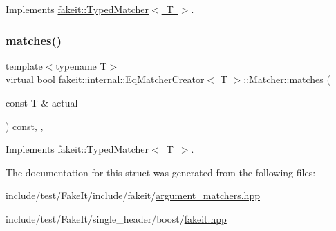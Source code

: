 Implements \mbox{\hyperlink{structfakeit_1_1TypedMatcher_ac553bb6ac7c98a489c92fa6ace0f2e2b}{fakeit\+::\+Typed\+Matcher$<$ T $>$}}.

\mbox{\label{structfakeit_1_1internal_1_1EqMatcherCreator_1_1Matcher_a777fef5dafff87f2e8cb7a0201a9bc78}} 
\subsubsection{\texorpdfstring{matches()}{matches()}\hspace{0.1cm}{\footnotesize\ttfamily [9/9]}}
{\footnotesize\ttfamily template$<$typename T$>$ \\
virtual bool \mbox{\hyperlink{structfakeit_1_1internal_1_1EqMatcherCreator}{fakeit\+::internal\+::\+Eq\+Matcher\+Creator}}$<$ T $>$\+::Matcher\+::matches (\begin{DoxyParamCaption}\item[{const T \&}]{actual }\end{DoxyParamCaption}) const\hspace{0.3cm}{\ttfamily [inline]}, {\ttfamily [override]}, {\ttfamily [virtual]}}



Implements \mbox{\hyperlink{structfakeit_1_1TypedMatcher_ac553bb6ac7c98a489c92fa6ace0f2e2b}{fakeit\+::\+Typed\+Matcher$<$ T $>$}}.



The documentation for this struct was generated from the following files\+:\begin{DoxyCompactItemize}
\item 
include/test/\+Fake\+It/include/fakeit/\mbox{\hyperlink{argument__matchers_8hpp}{argument\+\_\+matchers.\+hpp}}\item 
include/test/\+Fake\+It/single\+\_\+header/boost/\mbox{\hyperlink{single__header_2boost_2fakeit_8hpp}{fakeit.\+hpp}}\end{DoxyCompactItemize}
